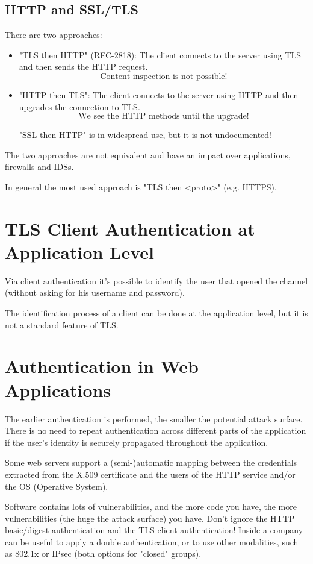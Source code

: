 \subsection{HTTP and SSL/TLS}
There are two approaches:
\begin{itemize}
    \item "TLS then HTTP" (RFC-2818): The client connects to the server using TLS and then sends the HTTP request.
    \[
        \text{Content inspection is not possible!}
    \]
    \item "HTTP then TLS": The client connects to the server using HTTP and then upgrades the connection to TLS.
    \[
        \text{We see the HTTP methods until the upgrade!}
    \]
    \begin{tcolorbox}[colback=red!10!white, colframe=red!70!black, coltitle=white, title=Beware]
    "SSL then HTTP" is in widespread use, but it is not undocumented!
    \end{tcolorbox}
\end{itemize}

The two approaches are not equivalent and have an impact over applications, firewalls and IDSs.

In general the most used approach is "TLS then <proto>" (e.g. HTTPS).

\section{TLS Client Authentication at Application Level}
Via client authentication it's possible to identify the user that opened the channel (without asking for his username and password).

The identification process of a client can be done at the application level, but it is not a standard feature of TLS.

\section{Authentication in Web Applications}
The earlier authentication is performed, the smaller the potential attack surface. There is no need to repeat authentication across different parts of the application if the user’s identity is securely propagated throughout the application.

Some web servers support a (semi-)automatic mapping between the credentials extracted from the X.509 certificate and the users of the HTTP service and/or the OS (Operative System).
\begin{tcolorbox}[colback=red!10!white, colframe=red!70!black, coltitle=white, title=Beware]
Software contains lots of vulnerabilities, and the more code you have, the more vulnerabilities (the huge the attack surface) you have. Don't ignore the HTTP basic/digest authentication and the TLS client authentication! Inside a company can be useful to apply a double authentication, or to use other modalities, such as 802.1x or IPsec (both options for "closed" groups).
\end{tcolorbox}

